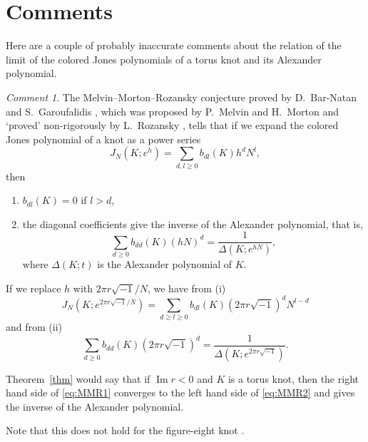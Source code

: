 \documentclass[a4paper,draft]{amsart}
\theoremstyle{plain}
\theoremstyle{definition}
\theoremstyle{remark}
\newtheorem{com}[thm]{Comment}
\renewcommand{\Im}{\operatorname{Im}}
\numberwithin{equation}{section}
\begin{document}
\section{Comments}
Here are a couple of probably inaccurate comments about the relation of the
limit of the colored Jones polynomials of a torus knot and its Alexander
polynomial.
\begin{com}
The Melvin--Morton--Rozansky conjecture proved by D.~Bar-Natan and
S.~Garoufalidis \cite{BarNatan/Garoufalidis:INVEM96}, which was proposed by
P.~Melvin and H.~Morton \cite{Melvin/Morton:COMMP95} and `proved' non-rigorously
by L.~Rozansky \cite{Rozansky:COMMP96}, tells that if we expand the colored
Jones polynomial of a knot as a power series
\begin{equation*}
  J_N\left(K;e^{h}\right)=\sum_{d,l\ge0}b_{dl}(K)h^dN^l,
\end{equation*}
then
\begin{enumerate}
  \item[(i)]
  $b_{dl}(K)=0$ if $l>d$,
  \item[(ii)]
  the diagonal coefficients give the inverse of the Alexander polynomial,
  that is,
  \begin{equation*}
    \sum_{d\ge0}b_{dd}(K)(hN)^d=\frac{1}{\Delta(K;e^{hN})},
  \end{equation*}
  where $\Delta(K;t)$ is the Alexander polynomial of $K$.
\end{enumerate}
If we replace $h$ with $2\pi{r}\sqrt{-1}/N$, we have from (i)
\begin{equation}\label{eq:MMR1}
  J_N\left(K;e^{2\pi{r}\sqrt{-1}/N}\right)
  =
  \sum_{d\ge{l}\ge0}b_{dl}(K)(2\pi{r}\sqrt{-1})^dN^{l-d}
\end{equation}
and from (ii)
\begin{equation}\label{eq:MMR2}
  \sum_{d\ge0}b_{dd}(K)(2\pi{r}\sqrt{-1})^d
  =
  \frac{1}{\Delta(K;e^{2\pi{r}\sqrt{-1}})}.
\end{equation}
\par
Theorem~\ref{thm} would say that if $\Im{r}<0$ and $K$ is a torus knot,
then the right hand side of \eqref{eq:MMR1} converges to the left hand side
of \eqref{eq:MMR2} and gives the inverse of the Alexander polynomial.
\par
Note that this does not hold for the figure-eight knot
\cite{Murakami/Yokota:2004}.
\end{com}
\end{document}

